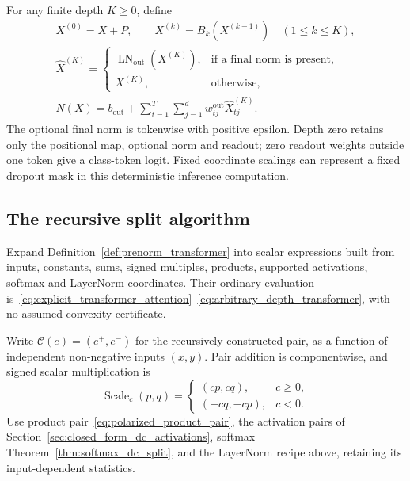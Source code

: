 \begin{definition}
For any finite depth $K\ge0$, define
\begin{equation}
\begin{gathered}
    X^{(0)}=X+P,\qquad X^{(k)}=B_k(X^{(k-1)})\quad(1\le k\le K),\\
    \widehat X^{(K)}=
    \begin{cases}\operatorname{LN}_{\mathrm{out}}(X^{(K)}),&\text{if a final norm is present},\\
    X^{(K)},&\text{otherwise},\end{cases}\\
    N(X)=b_{\mathrm{out}}+\sum_{t=1}^{T}\sum_{j=1}^{d}
           w_{tj}^{\mathrm{out}}\widehat X^{(K)}_{tj}.
\end{gathered}
    \label{eq:arbitrary_depth_transformer}
\end{equation}
The optional final norm is tokenwise with positive epsilon. Depth zero retains only the positional map, optional norm and readout; zero readout weights outside one token give a class-token logit. Fixed coordinate scalings can represent a fixed dropout mask in this deterministic inference computation.
\end{definition}

\subsection{The recursive split algorithm}

Expand Definition~\ref{def:prenorm_transformer} into scalar expressions built from inputs, constants, sums, signed multiples, products, supported activations, softmax and LayerNorm coordinates. Their ordinary evaluation is~\eqref{eq:explicit_transformer_attention}--\eqref{eq:arbitrary_depth_transformer}, with no assumed convexity certificate.

Write $\mathcal C(e)=(e^+,e^-)$ for the recursively constructed pair, as a function of independent non-negative inputs $(x,y)$. Pair addition is componentwise, and signed scalar multiplication is
\begin{equation}
    \operatorname{Scale}_c(p,q)=
    \begin{cases}(cp,cq),&c\ge0,\\(-cq,-cp),&c<0.
    \end{cases}
    \label{eq:transformer_pair_scale}
\end{equation}
Use product pair~\eqref{eq:polarized_product_pair}, the activation pairs of Section~\ref{sec:closed_form_dc_activations}, softmax Theorem~\ref{thm:softmax_dc_split}, and the LayerNorm recipe above, retaining its input-dependent statistics.

